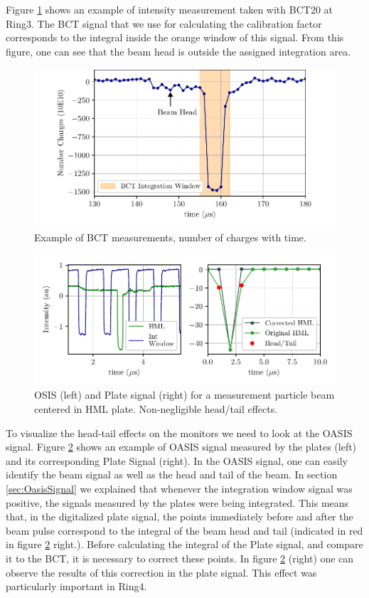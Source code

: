 Figure \ref{fig:HeadTailBCT} shows an example of intensity measurement taken with BCT20 at Ring3. The BCT signal that we use for calculating the calibration factor corresponds to the integral inside the orange window of this signal. From this figure, one can see that the beam head is outside the assigned integration area. 

\begin{figure}[h]
    \centering
    \includegraphics[width=0.9\columnwidth]{Figures_BeamTailEffect/BCT_HeadTail.pdf}
    \caption{Example of BCT measurements, number of charges with time. }
    \label{fig:HeadTailBCT}
\end{figure}

\begin{figure}[h]
    \centering
    \includegraphics[width=1.0\columnwidth]{Figures_BeamTailEffect/Plate_HeadTail.pdf}
    \caption{ OSIS (left) and Plate signal (right) for a measurement particle beam centered in HML plate. Non-negligible head/tail effects.}
    \label{fig:HeadTailPlate}
\end{figure}

To visualize the head-tail effects on the \hzhm monitors we need to look at the OASIS signal. Figure \ref{fig:HeadTailPlate} shows an example of OASIS signal measured by the plates (left) and its corresponding Plate Signal (right). In the OASIS signal, one can easily identify the beam signal as well as the head and tail of the beam. In section \ref{sec:OasisSignal} we explained that whenever the integration window signal was positive, the signals measured by the plates were being integrated. This means that, in the digitalized plate signal, the points immediately before and after the beam pulse correspond to the integral of the beam head and tail (indicated in red in figure \ref{fig:HeadTailPlate} right.). Before calculating the integral of the Plate signal, and compare it to the BCT, it is necessary to correct these points. In figure \ref{fig:HeadTailPlate} (right) one can observe the results of this correction in the plate signal. This effect was particularly important in Ring4.


